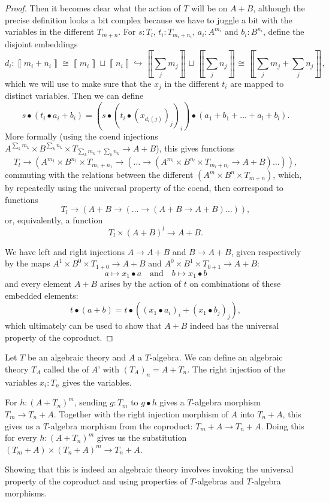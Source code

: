 \begin{proof}
  Then it becomes clear what the action of $ T $ will be on $ A + B $, although the precise definition looks a bit complex because we have to juggle a bit with the variables in the different $ T_{m + n} $. For $ s : T_l $, $ t_i : T_{m_i + n_i} $, $ a_i : A^{m_i} $ and $ b_i : B^{n_i} $, define the disjoint embeddings
  \[ d_i : \left\llbracket m_i + n_i \right\rrbracket \cong \left\llbracket m_i \right\rrbracket \sqcup \left\llbracket n_i \right\rrbracket \hookrightarrow \left\llbracket \sum_j m_j \right\rrbracket \sqcup \left\llbracket \sum_j n_j \right\rrbracket \cong \left\llbracket \sum_j m_j + \sum_j n_j \right\rrbracket, \]
  which we will use to make sure that the $ x_j $ in the different $ t_i $ are mapped to distinct variables. Then we can define
  \[ s \bullet (t_i \bullet a_i + b_i) = (s \bullet (t_i \bullet (x_{d_i(j)})_j)_i) \bullet (a_1 + b_1 + \dots + a_l + b_l). \]
  More formally (using the coend injections $ A^{\sum_k m_k} \times B^{\sum_k n_k} \times T_{\sum_k m_k + \sum_k n_k} \to A + B $), this gives functions
  \[ T_l \to (A^{m_1} \times B^{n_1} \times T_{m_1 + n_1} \to (\dots \to (A^{m_l} \times B^{n_l} \times T_{m_l + n_l} \to A + B) \dots )), \]
  commuting with the relations between the different $ (A^m \times B^n \times T_{m + n}) $, which, by repeatedly using the universal property of the coend, then correspond to functions
  \[ T_l \to (A + B \to (\dots \to (A + B \to A + B) \dots )), \]
  or, equivalently, a function
  \[ T_l \times (A + B)^l \to A + B. \]

  We have left and right injections $ A \to A + B $ and $ B \to A + B $, given respectively by the maps $ A^1 \times B^0 \times T_{1 + 0} \to A + B $ and $ A^0 \times B^1 \times T_{0 + 1} \to A + B $:
  \[ a \mapsto x_1 \bullet a \quad \text{and} \quad b \mapsto x_1 \bullet b \]
  and every element $ A + B $ arises by the action of $ t $ on combinations of these embedded elements:
  \[ t \bullet (a + b) = t \bullet ((x_1 \bullet a_i)_i + (x_1 \bullet b_j)_j), \]
  which ultimately can be used to show that $ A + B $ indeed has the universal property of the coproduct.
\end{proof}

\begin{definition}
  Let $ T $ be an algebraic theory and $ A $ a $ T $-algebra. We can define an algebraic theory $ T_A $ called the  of $ A $' with $ (T_A)_n = A + T_n $. The right injection of the variables $ x_i : T_n $ gives the variables.

  For $ h: (A + T_n)^m $, sending $ g: T_m $ to $ g \bullet h $ gives a $ T $-algebra morphism $ T_m \to T_n + A $. Together with the right injection morphism of $ A $ into $ T_n + A $, this gives us a $ T $-algebra morphism from the coproduct: $ T_m + A \to T_n + A $. Doing this for every $ h: (A + T_n)^m $ gives us the substitution $ (T_m + A) \times (T_n + A)^m \to T_n + A $.

  Showing that this is indeed an algebraic theory involves invoking the universal property of the coproduct and using properties of $ T $-algebras and $ T $-algebra morphisms.
\end{definition}

